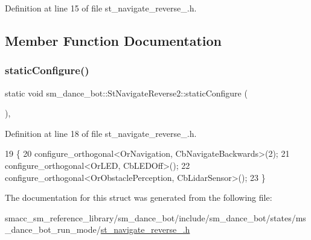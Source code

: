 Definition at line 15 of file st\+\_\+navigate\+\_\+reverse\+\_.\+h.



\subsection{Member Function Documentation}
\mbox{\label{structsm__dance__bot_1_1StNavigateReverse2_ae4809f28ccc5378f7a8f3c829d29d925}} 
\subsubsection{\texorpdfstring{static\+Configure()}{staticConfigure()}}
{\footnotesize\ttfamily static void sm\+\_\+dance\+\_\+bot\+::\+St\+Navigate\+Reverse2\+::static\+Configure (\begin{DoxyParamCaption}{ }\end{DoxyParamCaption})\hspace{0.3cm}{\ttfamily [inline]}, {\ttfamily [static]}}



Definition at line 18 of file st\+\_\+navigate\+\_\+reverse\+\_.\+h.


\begin{DoxyCode}
19    \{
20       configure\_orthogonal<OrNavigation, CbNavigateBackwards>(2);
21       configure\_orthogonal<OrLED, CbLEDOff>();
22       configure\_orthogonal<OrObstaclePerception, CbLidarSensor>();
23    \}
\end{DoxyCode}


The documentation for this struct was generated from the following file\+:\begin{DoxyCompactItemize}
\item 
smacc\+\_\+sm\+\_\+reference\+\_\+library/sm\+\_\+dance\+\_\+bot/include/sm\+\_\+dance\+\_\+bot/states/ms\+\_\+dance\+\_\+bot\+\_\+run\+\_\+mode/\hyperlink{st__navigate__reverse__2_8h}{st\+\_\+navigate\+\_\+reverse\+\_.\+h}\end{DoxyCompactItemize}
